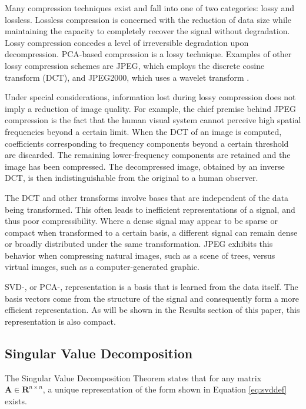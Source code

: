 \documentclass[conference]{IEEEtran}
\begin{document}
    Many compression techniques exist and fall into one of two categories: lossy and lossless. Lossless compression is concerned with the reduction of data size while maintaining the capacity to  completely recover the signal without degradation. Lossy compression concedes a level of irreversible degradation upon decompression. PCA-based compression is a lossy technique. Examples of other lossy compression schemes are JPEG, which employs the discrete cosine transform (DCT), and JPEG2000, which uses a wavelet transform \cite{jpeg_compression}\cite{jpeg2000_compression}.
    
    Under special considerations, information lost during lossy compression does not imply a reduction of image quality. For example, the chief premise behind JPEG compression is the fact that the human visual system cannot perceive high spatial frequencies beyond a certain limit. When the DCT of an image is computed, coefficients corresponding to frequency components beyond a certain threshold are discarded. The remaining lower-frequency components are retained and the image has been compressed. The decompressed image, obtained by an inverse DCT, is then indistinguishable from the original to a human observer.

    The DCT and other transforms involve bases that are independent of the data being transformed. This often leads to inefficient representations of a signal, and thus poor compressibility. Where a dense signal may appear to be sparse or compact when transformed to a certain basis, a different signal can remain dense or broadly distributed under the same transformation. JPEG exhibits this behavior when compressing natural images, such as a scene of trees, versus virtual images, such as a computer-generated graphic.
    
    SVD-, or PCA-, representation is a basis that is learned from the data itself. The basis vectors come from the structure of the signal and consequently form a more efficient representation. As will be shown in the Results section of this paper, this representation is also compact.
    
    \subsection{Singular Value Decomposition}
    The Singular Value Decomposition Theorem states that for any matrix $\mathbf{A} \in \mathbf{R}^{n \times n}$, a unique representation of the form shown in Equation \ref{eq:svddef} exists.
\end{document}

